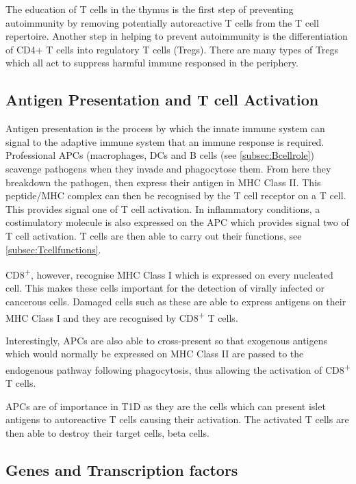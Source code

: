 The education of T cells in the thymus is the first step of preventing autoimmunity by removing potentially autoreactive T cells from the T cell repertoire.
Another step in helping to prevent autoimmunity is the differentiation of CD4+ T cells into regulatory T cells (Tregs).
There are many types of Tregs which all act to suppress harmful immune responsed in the periphery.



\subsection{Antigen Presentation and T cell Activation}
\label{subsec:Tcellactivation}

Antigen presentation is the process by which the innate immune system can signal to the adaptive immune system that an immune response is required.
Professional APCs (macrophages, DCs and B cells (see \cref{subsec:Bcellrole}) scavenge pathogens when they invade and phagocytose them.
From here they breakdown the pathogen, then express their antigen in MHC Class II.
This peptide/MHC complex can then be recognised by the T cell receptor on a T cell.
This provides signal one of T cell activation.
In inflammatory conditions, a costimulatory molecule is also expressed on the APC which provides signal two of T cell activation.
T cells are then able to carry out their functions, see \cref{subsec:Tcellfunctions}.

CD8\textsuperscript{+}, however, recognise MHC Class I which is expressed on every nucleated cell.
This makes these cells important for the detection of virally infected or cancerous cells.
Damaged cells such as these are able to express antigens on their MHC Class I and they are recognised by CD8\textsuperscript{+} T cells.

Interestingly, APCs are also able to cross-present so that exogenous antigens which would normally be expressed on MHC Class II are passed to the endogenous pathway following phagocytosis, thus allowing the activation of CD8\textsuperscript{+} T cells.

APCs are of importance in T1D as they are the cells which can present islet antigens to autoreactive T cells causing their activation.
The activated T cells are then able to destroy their target cells, beta cells.


\subsection{Genes and Transcription factors}
\label{subsec:Tcellgenes}

